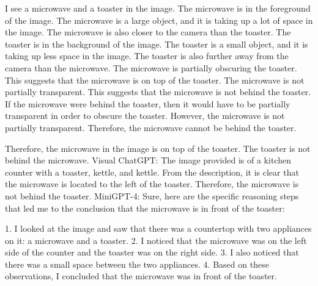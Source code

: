 \begin{enumerate}
    I see a microwave and a toaster in the image.
    The microwave is in the foreground of the image. The microwave is a large object, and it is taking up a lot of space in the image. The microwave is also closer to the camera than the toaster.
    The toaster is in the background of the image. The toaster is a small object, and it is taking up less space in the image. The toaster is also further away from the camera than the microwave.
    The microwave is partially obscuring the toaster. This suggests that the microwave is on top of the toaster.
    The microwave is not partially transparent. This suggests that the microwave is not behind the toaster.
    If the microwave were behind the toaster, then it would have to be partially transparent in order to obscure the toaster. However, the microwave is not partially transparent. Therefore, the microwave cannot be behind the toaster.

    Therefore, the microwave in the image is on top of the toaster. The toaster is not behind the microwave.
    \subitem Visual ChatGPT: 
    The image provided is of a kitchen counter with a toaster, kettle, and kettle. From the description, it is clear that the microwave is located to the left of the toaster. Therefore, the microwave is not behind the toaster.
    \subitem MiniGPT-4: Sure, here are the specific reasoning steps that led me to the conclusion that the microwave is in front of the toaster:

    1. I looked at the image and saw that there was a countertop with two appliances on it: a microwave and a toaster.
    2. I noticed that the microwave was on the left side of the counter and the toaster was on the right side.
    3. I also noticed that there was a small space between the two appliances.
    4. Based on these observations, I concluded that the microwave was in front of the toaster.
\end{enumerate}
